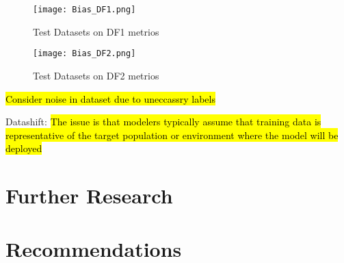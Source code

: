 \begin{figure}[H]
    \texttt{[image: Bias\_DF1.png]}
    \centering
    \caption{Test Datasets on DF1 metrios}
    \label{fig:DF1}
\end{figure}
\begin{figure}[H]
    \texttt{[image: Bias\_DF2.png]}
    \centering
    \caption{Test Datasets on DF2 metrios}
    \label{fig:DF2}
\end{figure}

\hl{Consider noise in dataset due to uneccassry labels}

Datashift:
\hl{The issue is that modelers typically assume that training data
is representative of the target population or environment where
the model will be deployed} \cite{saria2019tutorial}

\section{Further Research}

\section{Recommendations}
